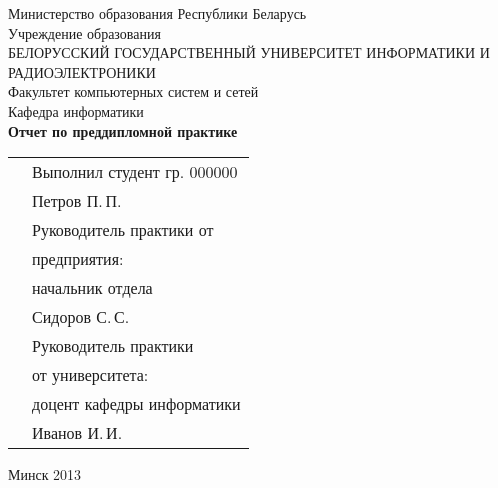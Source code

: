\begin{titlepage}
    
    \begin{center}
        Министерство образования Республики Беларусь \\[0.4cm] 

        Учреждение образования \\

        \MakeUppercase{БЕЛОРУССКИЙ ГОСУДАРСТВЕННЫЙ УНИВЕРСИТЕТ ИНФОРМАТИКИ И РАДИОЭЛЕКТРОНИКИ} \\[0.4cm]

        Факультет компьютерных систем и сетей \\[0.4cm]

        Кафедра информатики \\[3.4cm] %

        {\large\bfseries{Отчет по преддипломной практике}} \\[2cm]

        \noindent
        \begin{tabular}{p{}p{}}
            & Выполнил студент гр. 000000 \\
            & Петров П.\,П. \\[1cm]

            & Руководитель практики от \\
            & предприятия: \\
            & начальник отдела \\
            & Сидоров С.\,С. \\[1cm]

            & Руководитель практики \\
            & от университета: \\
            & доцент кафедры информатики \\
            & Иванов И.\,И. \\
        \end{tabular}

        \vfill

        {\normalsize Минск 2013}
    \end{center}

\end{titlepage}
